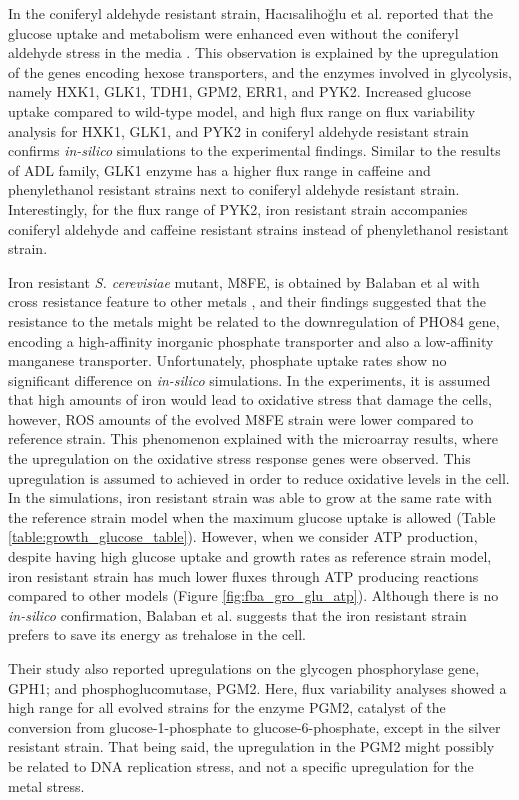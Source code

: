 In the coniferyl aldehyde resistant strain, Hacısalihoğlu et al. reported that the glucose uptake and metabolism were enhanced even without the coniferyl aldehyde stress in the media \cite{Hacsaliholu2019}. This observation is explained by the upregulation of the genes encoding hexose transporters, and the enzymes involved in glycolysis, namely HXK1, GLK1, TDH1, GPM2, ERR1, and PYK2. Increased glucose uptake compared to wild-type model, and high flux range on flux variability analysis for HXK1, GLK1, and PYK2 in coniferyl aldehyde resistant strain confirms \emph{in-silico} simulations to the experimental findings. Similar to the results of ADL family, GLK1 enzyme has a higher flux range in caffeine and phenylethanol resistant strains next to coniferyl aldehyde resistant strain. Interestingly, for the flux range of PYK2, iron resistant strain accompanies coniferyl aldehyde and caffeine resistant strains instead of phenylethanol resistant strain.


Iron resistant \emph{S. cerevisiae} mutant, M8FE, is obtained by Balaban et al with cross resistance feature to other metals \cite{balaban2020evolutionary}, and their findings suggested that the resistance to the metals might be related to the downregulation of PHO84 gene, encoding a high-affinity inorganic phosphate transporter and also a low-affinity manganese transporter. Unfortunately, phosphate uptake rates show no significant difference on \emph{in-silico} simulations. In the experiments, it is assumed that high amounts of iron would lead to oxidative stress that damage the cells, however, ROS amounts of the evolved M8FE strain were lower compared to reference strain. This phenomenon explained with the microarray results, where the upregulation on the oxidative stress response genes were observed. This upregulation is assumed to achieved in order to reduce oxidative levels in the cell. In the simulations, iron resistant strain was able to grow at the same rate with the reference strain model when the maximum glucose uptake is allowed (Table \ref{table:growth_glucose_table}). However, when we consider ATP production, despite having high glucose uptake and growth rates as reference strain model, iron resistant strain has much lower fluxes through ATP producing reactions compared to other models (Figure \ref{fig:fba_gro_glu_atp}). Although there is no \emph{in-silico} confirmation, Balaban et al. suggests that the iron resistant strain prefers to save its energy as trehalose in the cell.

Their study also reported upregulations on the glycogen phosphorylase gene, GPH1; and phosphoglucomutase, PGM2. Here, flux variability analyses showed a high range for all evolved strains for the enzyme PGM2, catalyst of the conversion from glucose-1-phosphate to glucose-6-phosphate, except in the silver resistant strain. That being said, the upregulation in the PGM2 might possibly be related to DNA replication stress, and not a specific upregulation for the metal stress.

